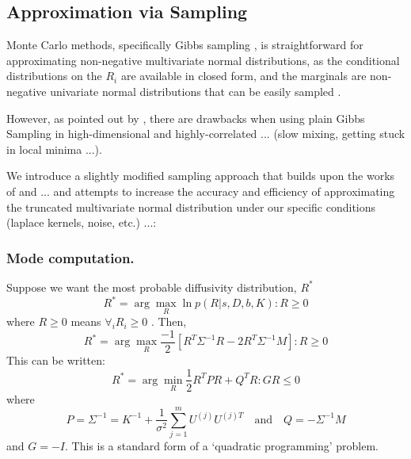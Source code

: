 \documentclass{article}
\begin{document}
\subsection{Approximation via Sampling}
Monte Carlo methods, specifically Gibbs sampling \cite{geman1984stochastic}, is straightforward for approximating non-negative multivariate normal distributions, as the conditional distributions on the \( R_i \) are available in closed form, and the marginals are non-negative univariate normal distributions that can be easily sampled \cite{TBD}.

However, as pointed out by \cite{prange2009quantifying}, there are drawbacks when using plain Gibbs Sampling in high-dimensional and highly-correlated ... (slow mixing, getting stuck in local minima ...).

We introduce a slightly modified sampling approach that builds upon the works of \cite{prange2009quantifying} and ... and attempts to increase the accuracy and efficiency of approximating the truncated multivariate normal distribution under our specific conditions (laplace kernels, noise, etc.) ...: 

\subsubsection{Mode computation.}
Suppose we want the most probable diffusivity distribution,
$R^*$
\begin{equation}
   R^* = \arg \max_R \ln p(R|s,D,b,K) : R \geq 0
\end{equation} 
where $R \geq 0$ means $\forall_i R_i \geq 0$
. Then,
\begin{equation}
    R^* = \arg \max_R \frac{-1}{2}[R^T \Sigma^{-1} R -2 R^T \Sigma^{-1} M ]: R \geq 0
\end{equation}  
This can be written:
\begin{equation}
   R^* = \arg \min_R \frac{1}{2} R^T P R + Q^T R : G R \leq 0
\end{equation}
where
\begin{equation}
 P = \Sigma^{-1} = K^{-1} + \frac{1}{\sigma^2} \sum_{j=1}^m  U^{(j)}U^{(j)T} \quad \mbox{and} \quad Q = - \Sigma^{-1} M
\end{equation}
and $G = -I$. This is a standard form of a  `quadratic programming' problem.
\end{document}
